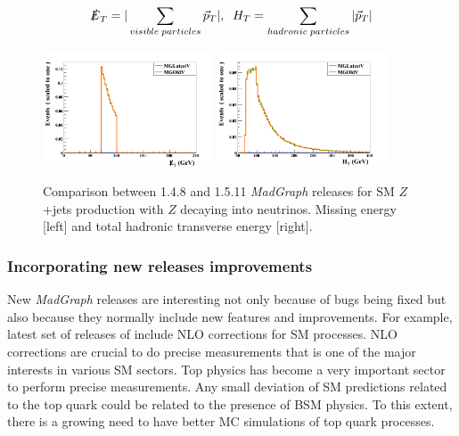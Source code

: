 \begin{equation}
  \label{eq:METHT}
  \slashed{E}_{T}=|\sum_{visible\; particles}\vec{p}_{T}|, \; \; H_{T}=\sum_{hadronic\; particles}|\vec{p}_{T}|
\end{equation}

\begin{figure}[!Hhtbp]
  \begin{center}
    \includegraphics[width=0.45\textwidth]{figs/ZjetsRelVal8.png}
    \includegraphics[width=0.45\textwidth]{figs/ZjetsRelVal9.png}
    \caption{Comparison between 1.4.8 and 1.5.11 \textit{MadGraph} releases for SM $Z$+jets production with $Z$ decaying into neutrinos. Missing energy [left] and total hadronic transverse energy [right].}
    \label{fig:ZRelVal2}
  \end{center}
\end{figure}

\subsubsection{Incorporating new releases improvements}

New \textit{MadGraph} releases are interesting not only because of bugs being fixed but also because they normally include new features and improvements. For example, latest set of releases of include NLO corrections for SM processes. NLO corrections are crucial to do precise measurements that is one of the major interests in various SM sectors. Top physics has become a very important sector to perform precise measurements. Any small deviation of SM predictions related to the top quark could be related to the presence of BSM physics. To this extent, there is a growing need to have better MC simulations of top quark processes.

